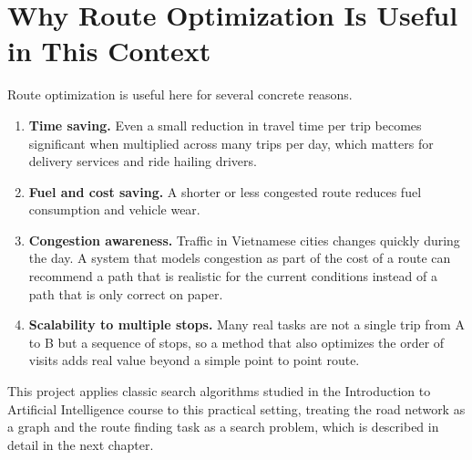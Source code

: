 \section{Why Route Optimization Is Useful in This Context}

Route optimization is useful here for several concrete reasons.

\begin{enumerate}[itemsep=2pt]
  \item \textbf{Time saving.} Even a small reduction in travel time per trip becomes significant when multiplied across many trips per day, which matters for delivery services and ride hailing drivers.
  \item \textbf{Fuel and cost saving.} A shorter or less congested route reduces fuel consumption and vehicle wear.
  \item \textbf{Congestion awareness.} Traffic in Vietnamese cities changes quickly during the day. A system that models congestion as part of the cost of a route can recommend a path that is realistic for the current conditions instead of a path that is only correct on paper.
  \item \textbf{Scalability to multiple stops.} Many real tasks are not a single trip from A to B but a sequence of stops, so a method that also optimizes the order of visits adds real value beyond a simple point to point route.
\end{enumerate}

This project applies classic search algorithms studied in the Introduction to Artificial Intelligence course to this practical setting, treating the road network as a graph and the route finding task as a search problem, which is described in detail in the next chapter.
